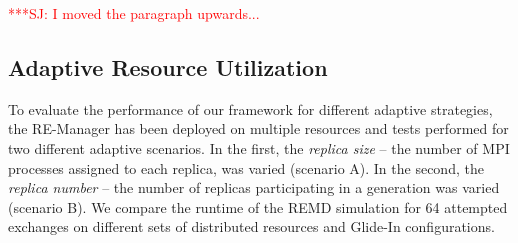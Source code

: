 \documentclass{rspublic}
\newcommand{\jhanote}[1]{ {\textcolor{red} { ***SJ: #1 }}}
\newcommand{\jhanote}[1]{}
\begin{document}
\jhanote{I moved the paragraph upwards...}


\subsection{Adaptive Resource Utilization}

To evaluate the performance of our framework for different adaptive
strategies, the RE-Manager has been deployed on multiple
resources %
and tests performed for two different adaptive scenarios.  In the
first, the \emph{replica size} -- the number of MPI processes assigned
to each replica, was varied (scenario A). In the second, the
\emph{replica number} -- the number of replicas participating in a
generation was varied (scenario B). We compare the runtime of the REMD
simulation for 64 attempted exchanges on different sets of distributed
resources and Glide-In configurations.
                    
\end{document}
